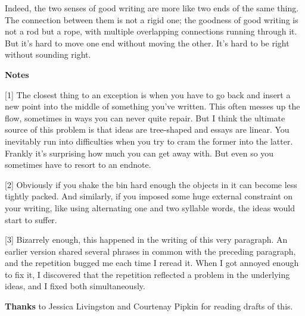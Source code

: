 Indeed, the two senses of good writing are more like two ends of the
same thing. The connection between them is not a rigid one; the goodness
of good writing is not a rod but a rope, with multiple overlapping
connections running through it. But it's hard to move one end without
moving the other. It's hard to be right without sounding right.

\textbf{Notes}

{[}1{]} The closest thing to an exception is when you have to go back
and insert a new point into the middle of something you've written. This
often messes up the flow, sometimes in ways you can never quite repair.
But I think the ultimate source of this problem is that ideas are
tree-shaped and essays are linear. You inevitably run into difficulties
when you try to cram the former into the latter. Frankly it's surprising
how much you can get away with. But even so you sometimes have to resort
to an endnote.

{[}2{]} Obviously if you shake the bin hard enough the objects in it can
become less tightly packed. And similarly, if you imposed some huge
external constraint on your writing, like using alternating one and two
syllable words, the ideas would start to suffer.

{[}3{]} Bizarrely enough, this happened in the writing of this very
paragraph. An earlier version shared several phrases in common with the
preceding paragraph, and the repetition bugged me each time I reread it.
When I got annoyed enough to fix it, I discovered that the repetition
reflected a problem in the underlying ideas, and I fixed both
simultaneously.

\textbf{Thanks} to Jessica Livingston and Courtenay Pipkin for reading
drafts of this.
